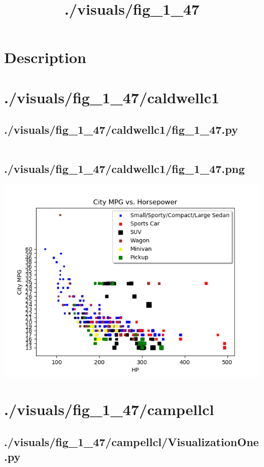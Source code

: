\documentclass{article}
\begin{document}
    \title{./visuals/fig\_1\_47}
    \maketitle
    \section{Description}
    \small
    
    \pagebreak
    \section{./visuals/fig\_1\_47/caldwellc1}
    \subsection{./visuals/fig\_1\_47/caldwellc1/fig\_1\_47.py}
    \inputminted{python}{.././visuals/fig_1_47/caldwellc1/fig_1_47.py}
    \subsection{./visuals/fig\_1\_47/caldwellc1/fig\_1\_47.png}
    \includegraphics[width=\textwidth]{.././visuals/fig_1_47/caldwellc1/fig_1_47.png}
    \pagebreak
    \section{./visuals/fig\_1\_47/campellcl}
    \subsection{./visuals/fig\_1\_47/campellcl/VisualizationOne.py}
    \inputminted{python}{.././visuals/fig_1_47/campellcl/VisualizationOne.py}
\end{document}
